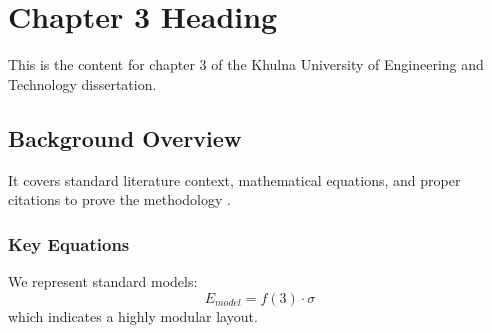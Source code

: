 \chapter{Chapter 3 Heading}
\label{ch:chapter3}
This is the content for chapter 3 of the Khulna University of Engineering and Technology dissertation.

\section{Background Overview}
It covers standard literature context, mathematical equations, and proper citations to prove the methodology \cite{texbook}.

\subsection{Key Equations}
We represent standard models:
\begin{equation}
    E_{model} = f(3) \cdot \sigma
\end{equation}
which indicates a highly modular layout.
